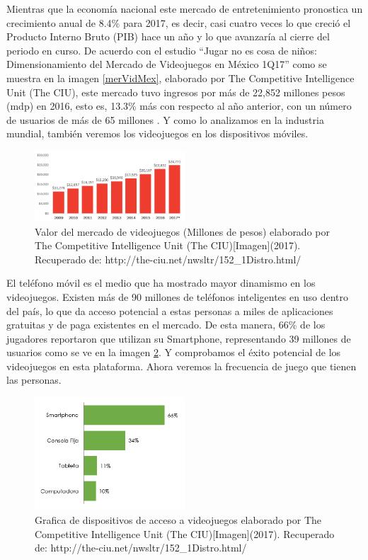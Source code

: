 Mientras que la economía nacional este mercado de entretenimiento pronostica un crecimiento anual de 8.4\% para 2017, es decir, casi cuatro veces lo que creció el Producto Interno Bruto (PIB) hace un año y lo que avanzaría al cierre del periodo en curso. De acuerdo con el estudio “Jugar no es cosa de niños: Dimensionamiento del Mercado de Videojuegos en México 1Q17” como se muestra en la imagen \ref{merVidMex}, elaborado por The Competitive Intelligence Unit (The CIU), este mercado tuvo ingresos por más de 22,852 millones pesos (mdp) en 2016, esto es, 13.3\% más con respecto al año anterior, con un número de usuarios de más de 65 millones \cite{vid03}. Y como lo analizamos en la industria mundial, también veremos los videojuegos en los dispositivos móviles.
\\[1pt] 
\begin{figure}
	\centering
	\includegraphics[width=0.5\textwidth]{03MarcoTeorico/imageR/merVidMex.png}
	\caption{Valor del mercado de videojuegos (Millones de pesos) elaborado por The Competitive Intelligence Unit (The CIU)[Imagen](2017). Recuperado de: http://the-ciu.net/nwsltr/152\_1Distro.html/}
	\label{fig:merVidMex}
\end{figure}

El teléfono móvil es el medio que ha mostrado mayor dinamismo en los videojuegos. Existen más de 90 millones de teléfonos inteligentes en uso dentro del país, lo que da acceso potencial a estas personas a miles de aplicaciones gratuitas y de paga existentes en el mercado. De esta manera, 66\% de los jugadores reportaron que utilizan su Smartphone, representando 39 millones de usuarios como se ve en la imagen \ref{fig:dispVid}. Y comprobamos el éxito potencial de los videojuegos en esta plataforma. Ahora veremos la frecuencia de juego que tienen las personas. 
\\[1pt] 	

\begin{figure}
	\centering
	\includegraphics[width=0.5\textwidth]{03MarcoTeorico/imageR/dispVid.png}
	\caption{Grafica de dispositivos de acceso a videojuegos elaborado por The Competitive Intelligence Unit (The CIU)[Imagen](2017). Recuperado de: http://the-ciu.net/nwsltr/152\_1Distro.html/}
	\label{fig:dispVid}
\end{figure}

